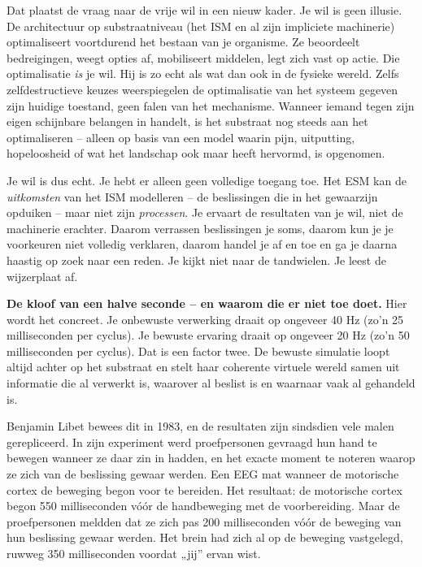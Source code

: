 \documentclass[11pt, twoside, openright]{book}
\begin{document}
Dat plaatst de vraag naar de vrije wil in een nieuw kader. Je wil is geen illusie. De architectuur op substraatniveau (het ISM en al zijn impliciete machinerie) optimaliseert voortdurend het bestaan van je organisme. Ze beoordeelt bedreigingen, weegt opties af, mobiliseert middelen, legt zich vast op actie. Die optimalisatie \textit{is} je wil. Hij is zo echt als wat dan ook in de fysieke wereld. Zelfs zelfdestructieve keuzes weerspiegelen de optimalisatie van het systeem gegeven zijn huidige toestand, geen falen van het mechanisme. Wanneer iemand tegen zijn eigen schijnbare belangen in handelt, is het substraat nog steeds aan het optimaliseren -- alleen op basis van een model waarin pijn, uitputting, hopeloosheid of wat het landschap ook maar heeft hervormd, is opgenomen.

Je wil is dus echt. Je hebt er alleen geen volledige toegang toe. Het ESM kan de \textit{uitkomsten} van het ISM modelleren -- de beslissingen die in het gewaarzijn opduiken -- maar niet zijn \textit{processen}. Je ervaart de resultaten van je wil, niet de machinerie erachter. Daarom verrassen beslissingen je soms, daarom kun je je voorkeuren niet volledig verklaren, daarom handel je af en toe en ga je daarna haastig op zoek naar een reden. Je kijkt niet naar de tandwielen. Je leest de wijzerplaat af.

\textbf{De kloof van een halve seconde -- en waarom die er niet toe doet.} Hier wordt het concreet. Je onbewuste verwerking draait op ongeveer 40 Hz (zo’n 25 milliseconden per cyclus). Je bewuste ervaring draait op ongeveer 20 Hz (zo’n 50 milliseconden per cyclus). Dat is een factor twee. De bewuste simulatie loopt altijd achter op het substraat en stelt haar coherente virtuele wereld samen uit informatie die al verwerkt is, waarover al beslist is en waarnaar vaak al gehandeld is.

Benjamin Libet bewees dit in 1983, en de resultaten zijn sindsdien vele malen gerepliceerd. In zijn experiment werd proefpersonen gevraagd hun hand te bewegen wanneer ze daar zin in hadden, en het exacte moment te noteren waarop ze zich van de beslissing gewaar werden. Een EEG mat wanneer de motorische cortex de beweging begon voor te bereiden. Het resultaat: de motorische cortex begon 550 milliseconden vóór de handbeweging met de voorbereiding. Maar de proefpersonen meldden dat ze zich pas 200 milliseconden vóór de beweging van hun beslissing gewaar werden. Het brein had zich al op de beweging vastgelegd, ruwweg 350 milliseconden voordat „jij” ervan wist.
\end{document}
